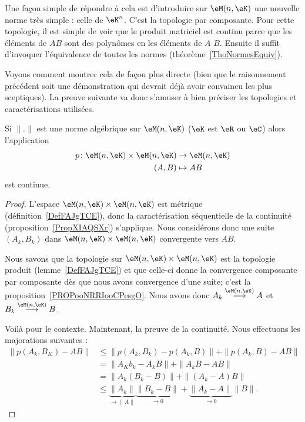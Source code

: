 Une façon simple de répondre à cela est d'introduire sur \( \eM(n,\eK)\) une nouvelle norme très simple : celle de \( \eK^n\). C'est la topologie par composante. Pour cette topologie, il est simple de voir que le produit matriciel est continu parce que les éléments de \( AB\) sont des polynômes en les éléments de \( A\) \( B\). Ensuite il suffit d'invoquer l'équivalence de toutes les normes (théorème~\ref{ThoNormesEquiv}).

Voyons comment montrer cela de façon plus directe (bien que le raisonnement précédent soit une démonstration qui devrait déjà avoir convaincu les plus sceptiques). La preuve suivante va donc s'amuser à bien préciser les topologies et caractérisations utilisées.

\begin{lemma}
	Si \( \| . \|\) est une norme algébrique sur \( \eM(n,\eK)\) (\( \eK\) est \( \eR\) ou \( \eC\)) alors l'application
	\begin{equation}
		\begin{aligned}
			p\colon \eM(n,\eK)\times \eM(n,\eK) & \to \eM(n,\eK) \\
			(A,B)                               & \mapsto AB
		\end{aligned}
	\end{equation}
	est continue.
\end{lemma}

\begin{proof}
	L'espace \( \eM(n,\eK)\times \eM(n,\eK)\) est métrique (définition~\ref{DefFAJgTCE}), donc la caractérisation séquentielle de la continuité (proposition~\ref{PropXIAQSXr}) s'applique. Nous considérons donc une suite \( (A_k,B_k)\) dans \( \eM(n,\eK)\times \eM(n,\eK)\) convergente vers \( AB\).

	Nous savons que la topologie sur \( \eM(n,\eK)\times \eM(n,\eK)\) est la topologie produit (lemme~\ref{DefFAJgTCE}) et que celle-ci donne la convergence composante par composante dès que nous avons convergence d'une suite; c'est la proposition~\ref{PROPooNRRIooCPesgO}. Nous avons donc \( A_k\stackrel{\eM(n,\eK)}{\longrightarrow}A\) et \( B_k\stackrel{\eM(n,\eK)}{\longrightarrow}B\).

	Voilà pour le contexte. Maintenant, la preuve de la continuité. Nous effectuons les majorations suivantes :
	\begin{subequations}
		\begin{align}
			\| p(A_k,B_K)-AB \| & \leq \| p(A_k,B_k)-p(A_k,B) \|+\| p(A_k,B)-AB \|                                                                   \\
			                    & =\| A_Kb_k-A_kB \|+\| A_kB-AB \|                                                                                   \\
			                    & =\| A_k(B_k-B) \|+\| (A_k-A)B \|                                                                                   \\
			                    & \leq \underbrace{\| A_k \|}_{\to \| A \|}\underbrace{\| B_k-B \|}_{\to 0}+\underbrace{\| A_k-A \|}_{\to 0}\| B \|.
		\end{align}
	\end{subequations}
\end{proof}
